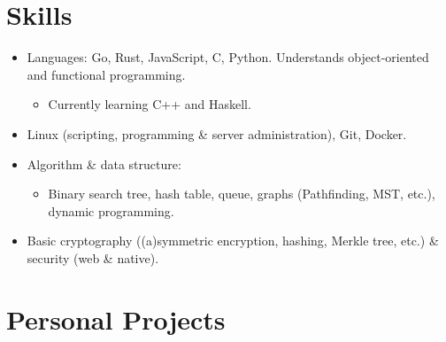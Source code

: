   \section{Skills}

  \begin{itemize}[itemsep=0.1\parskip]
    \item Languages: Go, Rust, JavaScript, C, Python. Understands object-oriented and functional programming.

    \begin{itemize}
      \item Currently learning C++ and Haskell.
    \end{itemize}

    \item Linux (scripting, programming \& server administration), Git, Docker.

    \item Algorithm \& data structure:

    \begin{itemize}
      \item Binary search tree, hash table, queue, graphs (Pathfinding, MST, etc.), dynamic programming.
    \end{itemize}

    \item Basic cryptography ((a)symmetric encryption, hashing, Merkle tree, etc.) \& security (web \& native).

  \end{itemize}

  \section{Personal Projects}

  \def\ghurl#1{%
    \href{#1}{({\blueghicon{}})}%
  }

